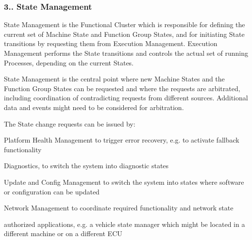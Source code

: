 \subsubsection*{3.. State Management}

State Management is the Functional Cluster which is responsible for defining the current set of Machine State and Function Group States, and for initiating State transitions by requesting them from Execution Management. Execution Management performs the State transitions and controls the actual set of running Processes, depending on the current States.

State Management is the central point where new Machine States and the Function Group States can be requested and where the requests are arbitrated, including coordination of contradicting requests from different sources. Additional data and events might need to be considered for arbitration.

The State change requests can be issued by\+:
\begin{DoxyItemize}
\item Platform Health Management to trigger error recovery, e.\+g. to activate fallback functionality
\item Diagnostics, to switch the system into diagnostic states
\item Update and Config Management to switch the system into states where software or configuration can be updated
\item Network Management to coordinate required functionality and network state
\item authorized applications, e.\+g. a vehicle state manager which might be located in a different machine or on a different E\+CU
\end{DoxyItemize}

